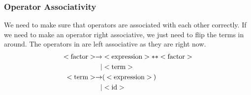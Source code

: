 \subsubsection{Operator Associativity}\label{subsubsec:Operator_Associativity}
We need to make sure that operators are associated with each other correctly.
If we need to make an operator right associative, we just need to flip the terms in  around.
The operators in  are left associative as they are right now.
\begin{equation}\label{eq:Operator_Associativity}
  \begin{aligned}
    <\text{factor}> \rightarrow &<\text{expression}> ** <\text{factor}> \\
    \vert &<\text{term}> \\
    <\text{term}> \rightarrow &( \: <\text{expression}> \: ) \\
    \vert &<\text{id}> \\
  \end{aligned}
\end{equation}
